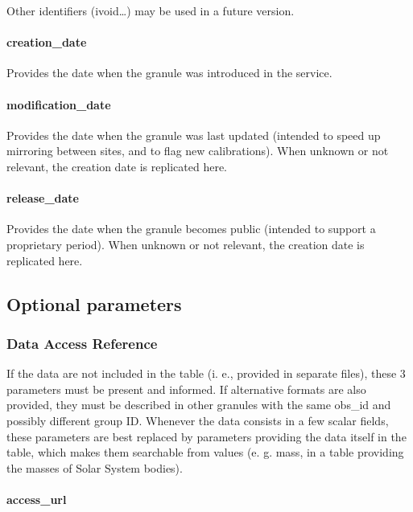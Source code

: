 \documentclass[11pt,a4paper]{ivoa}
\begin{document}
Other identifiers (ivoid…) may be used in a future version.

\paragraph{creation\_date}

Provides the date when the granule was introduced in the service.

\paragraph{modification\_date}

Provides the date when the granule was last updated (intended to speed up mirroring between sites, and to flag new calibrations). When unknown or not relevant, the creation date is replicated here.

\paragraph{release\_date}

Provides the date when the granule becomes public (intended to support a proprietary period). When unknown or not relevant, the creation date is replicated here.

\subsection{Optional parameters}

\subsubsection{Data Access Reference}

If the data are not included in the table (i. e., provided in separate files), these 3 parameters must be present and informed. If alternative formats are also provided, they must be described in other granules with the same obs\_id and possibly different group ID. Whenever the data consists in a few scalar fields, these parameters are best replaced by parameters providing the data itself in the table, which makes them searchable from values (e. g. mass, in a table providing the masses of Solar System bodies).

\paragraph{access\_url}
\end{document}
